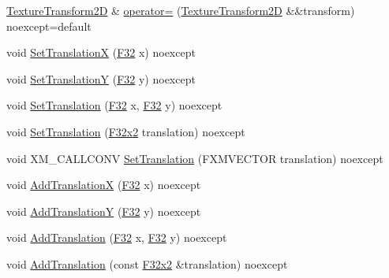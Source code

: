 \begin{DoxyCompactItemize}
\mbox{\hyperlink{classmage_1_1_texture_transform2_d}{Texture\+Transform2D}} \& \mbox{\hyperlink{classmage_1_1_texture_transform2_d_a7b793ceb3ad9eabf7269f82b2bfe1ef8}{operator=}} (\mbox{\hyperlink{classmage_1_1_texture_transform2_d}{Texture\+Transform2D}} \&\&transform) noexcept=default
\item 
void \mbox{\hyperlink{classmage_1_1_texture_transform2_d_a048b06918c96b0a36e68da06728c5a03}{Set\+TranslationX}} (\mbox{\hyperlink{namespacemage_aa97e833b45f06d60a0a9c4fc22ae02c0}{F32}} x) noexcept
\item 
void \mbox{\hyperlink{classmage_1_1_texture_transform2_d_a8d4920dcc0b3d03a8dc09ba7a472a6d9}{Set\+TranslationY}} (\mbox{\hyperlink{namespacemage_aa97e833b45f06d60a0a9c4fc22ae02c0}{F32}} y) noexcept
\item 
void \mbox{\hyperlink{classmage_1_1_texture_transform2_d_a36f5af01ebcc7860e6fc7eac47448425}{Set\+Translation}} (\mbox{\hyperlink{namespacemage_aa97e833b45f06d60a0a9c4fc22ae02c0}{F32}} x, \mbox{\hyperlink{namespacemage_aa97e833b45f06d60a0a9c4fc22ae02c0}{F32}} y) noexcept
\item 
void \mbox{\hyperlink{classmage_1_1_texture_transform2_d_a8985cd71cf9ebb4861a01a5e2f905d56}{Set\+Translation}} (\mbox{\hyperlink{namespacemage_aee4759dedc8def6c6dec26b5c7eddf29}{F32x2}} translation) noexcept
\item 
void X\+M\+\_\+\+C\+A\+L\+L\+C\+O\+NV \mbox{\hyperlink{classmage_1_1_texture_transform2_d_a0116043e514f5a5e986986a040830fa4}{Set\+Translation}} (F\+X\+M\+V\+E\+C\+T\+OR translation) noexcept
\item 
void \mbox{\hyperlink{classmage_1_1_texture_transform2_d_aabf0cf1b976e4f0d87776bb2ae7b4293}{Add\+TranslationX}} (\mbox{\hyperlink{namespacemage_aa97e833b45f06d60a0a9c4fc22ae02c0}{F32}} x) noexcept
\item 
void \mbox{\hyperlink{classmage_1_1_texture_transform2_d_a43bf286ed51f622fd9062c5f3f1774ed}{Add\+TranslationY}} (\mbox{\hyperlink{namespacemage_aa97e833b45f06d60a0a9c4fc22ae02c0}{F32}} y) noexcept
\item 
void \mbox{\hyperlink{classmage_1_1_texture_transform2_d_a6100f5884c287a2ae1d3fd20bcab465b}{Add\+Translation}} (\mbox{\hyperlink{namespacemage_aa97e833b45f06d60a0a9c4fc22ae02c0}{F32}} x, \mbox{\hyperlink{namespacemage_aa97e833b45f06d60a0a9c4fc22ae02c0}{F32}} y) noexcept
\item 
void \mbox{\hyperlink{classmage_1_1_texture_transform2_d_a662f7ef13c003fc2838dd14446aa736a}{Add\+Translation}} (const \mbox{\hyperlink{namespacemage_aee4759dedc8def6c6dec26b5c7eddf29}{F32x2}} \&translation) noexcept

\end{DoxyCompactItemize}
